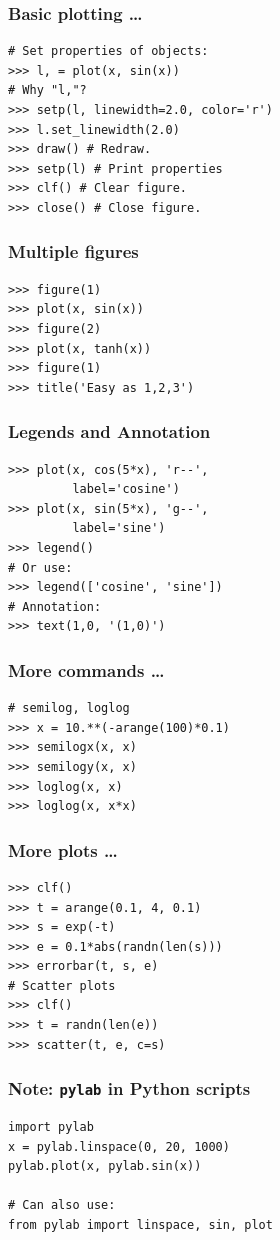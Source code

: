 \documentclass[14pt,compress]{beamer}
\newcommand{\typ}[1]{\texttt{#1}}
\begin{document}
\begin{frame}[fragile]
  \frametitle{Basic plotting \ldots}
\begin{lstlisting}
# Set properties of objects:
>>> l, = plot(x, sin(x))
# Why "l,"?
>>> setp(l, linewidth=2.0, color='r')
>>> l.set_linewidth(2.0)
>>> draw() # Redraw.
>>> setp(l) # Print properties
>>> clf() # Clear figure.
>>> close() # Close figure.
\end{lstlisting}
\end{frame}

\begin{frame}[fragile]
    \frametitle{Multiple figures}

\begin{lstlisting}
>>> figure(1)
>>> plot(x, sin(x))
>>> figure(2)
>>> plot(x, tanh(x))
>>> figure(1)
>>> title('Easy as 1,2,3')
\end{lstlisting}
    
\end{frame}


\begin{frame}[fragile]
  \frametitle{Legends and Annotation}
\begin{lstlisting}
>>> plot(x, cos(5*x), 'r--', 
         label='cosine')
>>> plot(x, sin(5*x), 'g--', 
         label='sine')
>>> legend() 
# Or use:
>>> legend(['cosine', 'sine'])
# Annotation:
>>> text(1,0, '(1,0)')
\end{lstlisting}
\end{frame}

\begin{frame}[fragile]
    \frametitle{More commands \ldots}
    \begin{lstlisting}
# semilog, loglog 
>>> x = 10.**(-arange(100)*0.1)
>>> semilogx(x, x)
>>> semilogy(x, x)
>>> loglog(x, x)
>>> loglog(x, x*x)
    \end{lstlisting}
\end{frame}

\begin{frame}[fragile]
    \frametitle{More plots \ldots}
    \begin{lstlisting}
>>> clf()
>>> t = arange(0.1, 4, 0.1)
>>> s = exp(-t)
>>> e = 0.1*abs(randn(len(s)))
>>> errorbar(t, s, e)
# Scatter plots
>>> clf()
>>> t = randn(len(e))
>>> scatter(t, e, c=s)
    \end{lstlisting}
\end{frame}

\begin{frame}[fragile]
    \frametitle{Note: \typ{pylab} in Python scripts}
\begin{lstlisting}
import pylab
x = pylab.linspace(0, 20, 1000)
pylab.plot(x, pylab.sin(x))

# Can also use:
from pylab import linspace, sin, plot
\end{lstlisting}
\end{frame}
\end{document}
